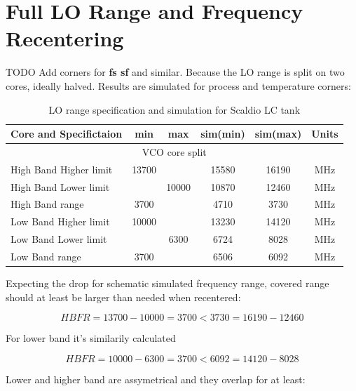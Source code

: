 \documentclass{article}
\begin{document}
\section{Full LO Range and Frequency Recentering}


TODO Add corners for \textbf{fs sf} and similar. Because the LO range is split on two cores, ideally halved. Results are simulated for process and temperature corners: 

\begin{table}[ht]
	\centering
	\begin{tabular}{|l|c|c|c|c|c|}
		\hline
		Core and Specifictaion & min & max & sim(min) & sim(max) & Units \\
		\hline
		\multicolumn{6}{|c|}{VCO core split} \\
		\hline
		High Band Higher limit & 13700 &  & 15580 & 16190  &  MHz  \\ 
		\hline
		High Band Lower limit &  & 10000 & 10870 & 12460 &  MHz  \\ 
		\hline
		High Band range & 3700 &  & 4710 & 3730 &  MHz  \\ 
		\hline
		Low Band Higher limit & 10000 &   & 13230 & 14120 &  MHz  \\ 
		\hline
		Low Band Lower limit &  & 6300 & 6724 & 8028  &  MHz  \\ 
		\hline
		Low Band range & 3700 &  & 6506 & 6092 &  MHz  \\ 
		\hline
	\end{tabular}
	\caption{LO range specification and simulation for Scaldio LC tank}
\end{table}

Expecting the drop for schematic simulated frequency range, covered range should at least be larger than needed when recentered: 

\begin{equation}
	HBFR = 13700 - 10000 = 3700 < 3730 = 16190 - 12460
\end{equation}

For lower band it's similarily calculated

\begin{equation}
	HBFR = 10000 - 6300 = 3700 < 6092 = 14120 - 8028
\end{equation}

Lower and higher band are assymetrical and they overlap for at least:
\end{document}
